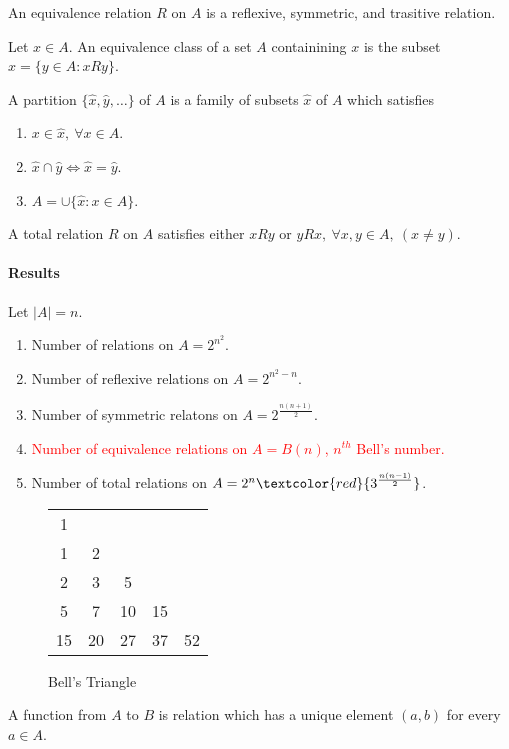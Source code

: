 \begin{definition}[equivalence]
	An equivalence relation $R$ on $A$ is a reflexive, symmetric, and trasitive relation.
\end{definition}

\begin{definition}
	Let $x \in A$.
	An equivalence class of a set $A$ containining $x$ is the subset $\hat{x} = \{ y \in A : xRy \}$.
\end{definition}

\begin{definition}[partition]
	A partition $\{\hat{x},\hat{y},\dots\}$ of $A$ is a family of subsets $\hat{x}$ of $A$ which satisfies
	\begin{enumerate}
		\item $x \in \hat{x},\ \forall x \in A$.
		\item $\hat{x} \cap \hat{y} \iff \hat{x} = \hat{y}$.
		\item $A = \cup \{ \hat{x} : x \in A\}$.
	\end{enumerate}
\end{definition}

\begin{definition}[total]
	A total relation $R$ on $A$ satisfies either $xRy \text{ or } yRx,\ \forall x,y \in A,\ (x \ne y)$.
\end{definition}


\paragraph{Results}
	Let $|A|=n$.
	\begin{enumerate}
		\item Number of relations on $A = 2^{n^2}$.
		\item Number of reflexive relations on $A = 2^{n^2-n}$.
		\item Number of symmetric relatons on $A = 2^{\frac{n(n+1)}{2}}$.
		\item \textcolor{red}{Number of equivalence relations on $A = B(n)$, $n^{th}$ Bell's number.}
		\item Number of total relations on $A = 2^n \textcolor{red}{3^{\frac{n(n-1)}{2}}}$.
	\end{enumerate}

\begin{figure}[h]
	\centering
	\begin{tabular}{ccccc}
		1 & & & & \\
		1 & 2 & & & \\
		2 & 3 & 5 & & \\
		5 & 7 & 10 & 15 & \\
		15 & 20 & 27 & 37 & 52\\
	\end{tabular}
	\caption{Bell's Triangle}
\end{figure}
\begin{definition}[Function]
	A function from $A$ to $B$ is relation which has a unique element $(a,b)$ for every $a \in A$.
\end{definition}

